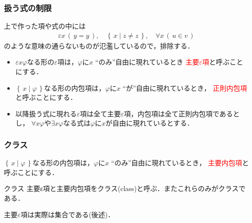 \documentclass[dvipdfmx,10pt,notheorems]{beamer}
\theoremstyle{definition}
\newcommand{\Set}[2]{\left\{\, #1 \mid #2\, \right\}} %
\begin{document}
\begin{frame}\frametitle{扱う式の制限}
	上で作った項や式の中には
	\begin{align}
		\varepsilon x\, (\, y = y\, ),\quad \Set{x}{z \neq z},\quad \forall x\, (\, u \in v\, )
	\end{align}
	のような意味の通らないものが氾濫しているので，排除する．
	
	\begin{itemize}
		\item $\varepsilon x \varphi$なる形の$\varepsilon$項は，$\varphi$に$x$ ``のみ''自由に現れているとき
			\textcolor{red}{主要$\varepsilon$項}と呼ぶことにする．
			
		\item $\Set{x}{\varphi}$なる形の内包項は，$\varphi$に$x$ ``が''自由に現れているとき，
			\textcolor{red}{正則内包項}と呼ぶことにする．
			
		\item 以降扱う式に現れる$\varepsilon$項は全て主要$\varepsilon$項，内包項は全て正則内包項であるとし，
			$\forall x \varphi$や$\exists x \varphi$なる式は$\varphi$に$x$が自由に現れているとする．
	\end{itemize}
\end{frame}

\begin{frame}\frametitle{クラス}
	
	$\Set{x}{\varphi}$なる形の内包項は，$\varphi$に$x$ ``のみ''自由に現れているとき，
	\textcolor{red}{主要内包項}と呼ぶことにする．
			
	\begin{exampleblock}{クラス}
		主要ε項と主要内包項をクラス(class)と呼ぶ．またこれらのみがクラスである．
	\end{exampleblock}
	
	主要$\varepsilon$項は実際は集合である(後述)．
	
\end{frame}
\end{document}
